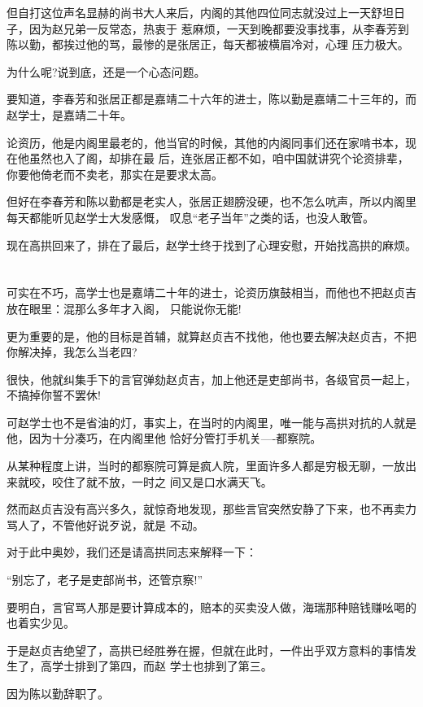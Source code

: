\documentclass[11pt,a4paper,onecolumn]{article}
\begin{document}
但自打这位声名显赫的尚书大人来后，内阁的其他四位同志就没过上一天舒坦日子，因为赵兄弟一反常态，热衷于
惹麻烦，一天到晚都要没事找事，从李春芳到陈以勤，都挨过他的骂，最惨的是张居正，每天都被横眉冷对，心理
压力极大。

为什么呢?说到底，还是一个心态问题。

要知道，李春芳和张居正都是嘉靖二十六年的进士，陈以勤是嘉靖二十三年的，而赵学士，是嘉靖二十年。

论资历，他是内阁里最老的，他当官的时候，其他的内阁同事们还在家啃书本，现在他虽然也入了阁，却排在最
后，连张居正都不如，咱中国就讲究个论资排辈，你要他倚老而不卖老，那实在是要求太高。

但好在李春芳和陈以勤都是老实人，张居正翅膀没硬，也不怎么吭声，所以内阁里每天都能听见赵学士大发感慨，
叹息``老子当年''之类的话，也没人敢管。

现在高拱回来了，排在了最后，赵学士终于找到了心理安慰，开始找高拱的麻烦。

\section[\thesection]{}

可实在不巧，高学士也是嘉靖二十年的进士，论资历旗鼓相当，而他也不把赵贞吉放在眼里：混那么多年才入阁，
只能说你无能!

更为重要的是，他的目标是首辅，就算赵贞吉不找他，他也要去解决赵贞吉，不把你解决掉，我怎么当老四?

很快，他就纠集手下的言官弹劾赵贞吉，加上他还是吏部尚书，各级官员一起上，不搞掉你誓不罢休!

可赵学士也不是省油的灯，事实上，在当时的内阁里，唯一能与高拱对抗的人就是他，因为十分凑巧，在内阁里他
恰好分管打手机关----都察院。

从某种程度上讲，当时的都察院可算是疯人院，里面许多人都是穷极无聊，一放出来就咬，咬住了就不放，一时之
间又是口水满天飞。

然而赵贞吉没有高兴多久，就惊奇地发现，那些言官突然安静了下来，也不再卖力骂人了，不管他好说歹说，就是
不动。

对于此中奥妙，我们还是请高拱同志来解释一下：

``别忘了，老子是吏部尚书，还管京察!''

要明白，言官骂人那是要计算成本的，赔本的买卖没人做，海瑞那种赔钱赚吆喝的也着实少见。

于是赵贞吉绝望了，高拱已经胜券在握，但就在此时，一件出乎双方意料的事情发生了，高学士排到了第四，而赵
学士也排到了第三。

因为陈以勤辞职了。
\end{document}
